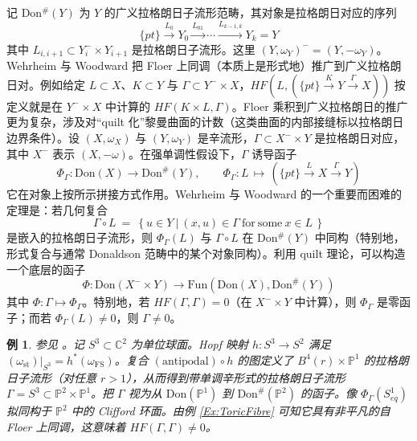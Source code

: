 \documentclass[11pt,a4paper]{article}
\numberwithin{equation}{section}
\newtheorem{Example}[thm]{例}
\newcommand{\bC}{\mathbb{C}}
\newcommand{\bP}{\mathbb{P}}
\newcommand{\st}{\operatorname{st}}
\begin{document}
记 Don$^{\#}(Y)$ 为 $Y$ 的广义拉格朗日子流形范畴，其对象是拉格朗日对应的序列
\[
\{pt\} \stackrel{L_0}{\longrightarrow} Y_0 \stackrel{L_{01}}{\longrightarrow} \cdots \stackrel{L_{k-1,k}}{\longrightarrow} Y_k = Y
\]
其中 $L_{i,i+1} \subset Y_i^- \times Y_{i+1}$ 是拉格朗日子流形。这里 $(Y,\omega_Y)^- = (Y, -\omega_Y)$。Wehrheim 与 Woodward \cite{WW1, WW2} 把 Floer 上同调（本质上是形式地）推广到广义拉格朗日对。例如给定 $L \subset X$、$K\subset Y$ 与 $\Gamma \subset Y^- \times X$，$HF(L, (\{pt\} \stackrel{K}{\longrightarrow} Y \stackrel{\Gamma}{\longrightarrow} X))$ 按定义就是在 $Y^- \times X$ 中计算的 $HF(K \times L, \Gamma)$。Floer 乘积到广义拉格朗日的推广更为复杂，涉及对“quilt 化”黎曼曲面的计数（这类曲面的内部接缝标以拉格朗日边界条件）。设 $(X,\omega_X)$ 与 $(Y,\omega_Y)$ 是辛流形，$\Gamma \subset X^-\times Y$ 是拉格朗日对应，其中 $X^-$ 表示 $(X,-\omega)$。在强单调性假设下，$\Gamma$ 诱导函子
\[
\Phi_{\Gamma}: \mathrm{Don}(X) \longrightarrow \mathrm{Don}^{\#}(Y),  \qquad  \Phi_{\Gamma}: L \, \mapsto \,  \left( \{pt\} \stackrel{L}{\longrightarrow} X \stackrel{\Gamma}{\longrightarrow} Y\right)
\]
它在对象上按所示拼接方式作用。Wehrheim 与 Woodward 的一个重要而困难的定理是：若几何复合
\[
\Gamma \circ L \ = \ \left\{ u \in Y \ \big| \ (x,u) \in \Gamma \ \mathrm{for \ some} \ x\in L\, \right\}
\]
是嵌入的拉格朗日子流形，则 $\Phi_{\Gamma}(L)$ 与 $\Gamma\circ L$ 在 Don$^{\#}(Y)$ 中同构（特别地，形式复合与通常 Donaldson 范畴中的某个对象同构）。利用 quilt 理论，可以构造一个底层的函子
\begin{equation} \label{Eqn:QuiltFunctor}
\Phi: \mathrm{Don}(X^- \times Y) \longrightarrow \mathrm{Fun}(\mathrm{Don}(X), \mathrm{Don}^{\#}(Y))
\end{equation}
其中 $\Phi: \Gamma \mapsto \Phi_{\Gamma}$。特别地，若 $HF(\Gamma,\Gamma) = 0$（在 $X^-\times Y$ 中计算），则 $\Phi_{\Gamma}$ 是零函子；而若 $\Phi_{\Gamma}(L) \neq 0$，则 $\Gamma \neq 0$。

\begin{Example} \label{Ex:Corr}
参见 \cite{WW2}。记 $S^3 \subset \bC^2$ 为单位球面。Hopf 映射 $h: S^3 \rightarrow S^2$ 满足 $(\omega_{\st})|_{S^3} = h^*(\omega_{\operatorname{FS}})$。复合 $(\mathrm{antipodal})\circ h$ 的图定义了 $B^4(r) \times \bP^1$ 的拉格朗日子流形（对任意 $r>1$），从而得到带单调辛形式的拉格朗日子流形 $\Gamma=S^3 \subset \bP^2 \times \bP^1$。把 $\Gamma$ 视为从 $\mathrm{Don}(\bP^1)$ 到 $\mathrm{Don}^{\#}(\bP^2)$ 的函子。像 $\Phi_{\Gamma}(S^1_{eq})$ 拟同构于 $\bP^2$ 中的 Clifford 环面。由例 \ref{Ex:ToricFibre} 可知它具有非平凡的自 Floer 上同调，这意味着 $HF(\Gamma,\Gamma) \neq 0$。
\end{Example}
\end{document}
